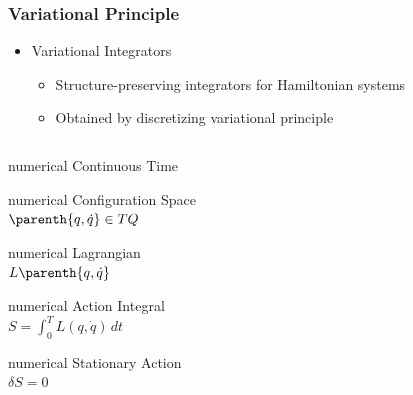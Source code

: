 \begin{frame}[noframenumbering] %
\frametitle{Variational Principle}
    \begin{itemize}
        \item Variational Integrators
            \begin{itemize}
                \item Structure-preserving integrators for Hamiltonian systems
                \item Obtained by discretizing variational principle
            \end{itemize}
    \end{itemize}
    \pause
    \begin{columns}[c]
        \begin{column}{0.5\textwidth}
            \centering
            \begin{beamercolorbox}[wd=0.8\columnwidth,sep=0.05cm,center]{numerical} Continuous Time \end{beamercolorbox}
            \begin{beamercolorbox}[wd=0.8\columnwidth,sep=0.05cm,center]{numerical} 
                Configuration Space \\
                \( \parenth{q, \dot{q} } \in TQ \)
            \end{beamercolorbox}
            \begin{beamercolorbox}[wd=0.8\columnwidth,sep=0.05cm,center]{numerical} 
                Lagrangian \\
                \( L\parenth{q, \dot{q} } \)
            \end{beamercolorbox}
            \begin{beamercolorbox}[wd=0.8\columnwidth,sep=0.05cm,center]{numerical} 
                Action Integral \\
                \( S = \int_{0}^T L\left( q, \dot{q}\right) \, dt \)
            \end{beamercolorbox}
            \begin{beamercolorbox}[wd=0.8\columnwidth,sep=0.05cm,center]{numerical} 
                Stationary Action \\
                \( \delta S = 0 \)
            \end{beamercolorbox}

\end{column}
\end{columns}
\end{frame}
